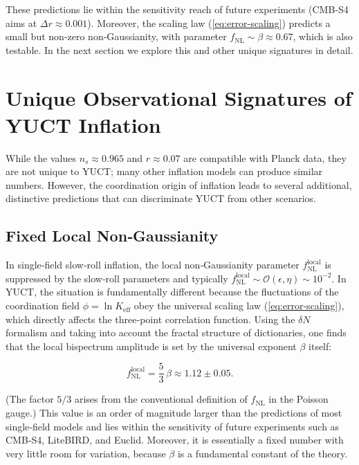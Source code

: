 \documentclass[12pt]{article}
\theoremstyle{remark}
\newcommand{\Keff}{K_{\mathrm{eff}}}
\begin{document}
	These predictions lie within the sensitivity reach of future experiments (CMB‑S4 aims at $\Delta r \approx 0.001$). Moreover, the scaling law (\ref{eq:error-scaling}) predicts a small but non‑zero non‑Gaussianity, with parameter $f_{\mathrm{NL}} \sim \beta \approx 0.67$, which is also testable. In the next section we explore this and other unique signatures in detail.
	
	\section{Unique Observational Signatures of YUCT Inflation}
	\label{sec:signatures}
	
	While the values $n_s \approx 0.965$ and $r \approx 0.07$ are compatible with Planck data, they are not unique to YUCT; many other inflation models can produce similar numbers. However, the coordination origin of inflation leads to several additional, distinctive predictions that can discriminate YUCT from other scenarios.
	
	\subsection{Fixed Local Non‑Gaussianity}
	
	In single‑field slow‑roll inflation, the local non‑Gaussianity parameter $f_{\text{NL}}^{\text{local}}$ is suppressed by the slow‑roll parameters and typically $f_{\text{NL}}^{\text{local}} \sim \mathcal{O}(\epsilon, \eta) \sim 10^{-2}$. In YUCT, the situation is fundamentally different because the fluctuations of the coordination field $\phi = \ln \Keff$ obey the universal scaling law (\ref{eq:error-scaling}), which directly affects the three‑point correlation function. Using the $\delta N$ formalism and taking into account the fractal structure of dictionaries, one finds that the local bispectrum amplitude is set by the universal exponent $\beta$ itself:
	
	\begin{equation}
		f_{\text{NL}}^{\text{local}} = \frac{5}{3}\,\beta \approx 1.12 \pm 0.05.
		\label{eq:fnl}
	\end{equation}
	
	(The factor $5/3$ arises from the conventional definition of $f_{\text{NL}}$ in the Poisson gauge.) This value is an order of magnitude larger than the predictions of most single‑field models and lies within the sensitivity of future experiments such as CMB‑S4, LiteBIRD, and Euclid. Moreover, it is essentially a fixed number with very little room for variation, because $\beta$ is a fundamental constant of the theory.
	
\end{document}
